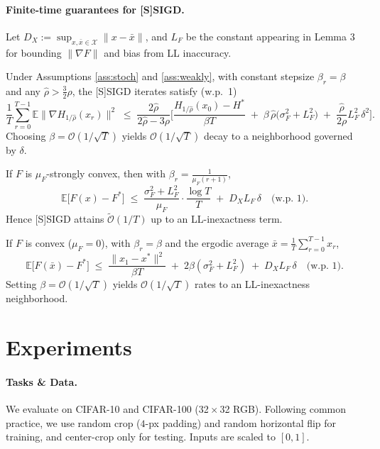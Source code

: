 \paragraph{Finite-time guarantees for [S]SIGD.}
Let $D_X:=\sup_{x,\bar x\in \mathcal{X}}\|x-\bar x\|$, and $L_F$ be the constant appearing in Lemma 3 for bounding $\|\nabla F\|$ and bias from LL inaccuracy.

\begin{theorem}
Under Assumptions \ref{ass:stoch} and \ref{ass:weakly}, with constant stepsize $\beta_r=\beta$ and any $\hat\rho> \tfrac{3}{2}\rho$, the [S]SIGD iterates satisfy (w.p.~1)
\[
\frac{1}{T}\sum_{r=0}^{T-1}\mathbb{E}\big\|\nabla H_{1/\hat\rho}(x_r)\big\|^2
\;\le\;
\frac{2\hat\rho}{2\hat\rho-3\rho}\Bigg[
\frac{H_{1/\hat\rho}(x_0)-H^*}{\beta T}
\;+\;\beta\,\hat\rho\big(\sigma_F^2+L_F^2\big)
\;+\;\frac{\hat\rho}{2\rho}L_F^2\,\delta^2
\Bigg].
\]
Choosing $\beta=\mathcal{O}(1/\sqrt{T})$ yields $\mathcal{O}(1/\sqrt{T})$ decay to a neighborhood governed by $\delta$.
\end{theorem}

\begin{theorem}
If $F$ is $\mu_F$-strongly convex, then with $\beta_r=\frac{1}{\mu_F(r+1)}$,
\[
\mathbb{E}\big[F(x)-F^*\big]
\;\le\;
\frac{\sigma_F^2+L_F^2}{\mu_F}\cdot \frac{\log T}{T}
\;+\; D_X L_F\,\delta
\quad\text{(w.p.~1)}.
\]
Hence [S]SIGD attains $\tilde{\mathcal{O}}(1/T)$ up to an LL-inexactness term.
\end{theorem}

\begin{theorem}
If $F$ is convex ($\mu_F=0$), with $\beta_r=\beta$ and the ergodic average $\bar x=\frac{1}{T}\sum_{r=0}^{T-1}x_r$,
\[
\mathbb{E}\big[F(\bar x)-F^*\big]
\;\le\;
\frac{\|x_1-x^*\|^2}{\beta T}
\;+\;2\beta(\sigma_F^2+L_F^2)
\;+\; D_X L_F\,\delta
\quad\text{(w.p.~1)}.
\]
Setting $\beta=\mathcal{O}(1/\sqrt{T})$ yields $\mathcal{O}(1/\sqrt{T})$ rates to an LL-inexactness neighborhood.
\end{theorem}
\section{Experiments}

\paragraph{Tasks \& Data.}
We evaluate on CIFAR-10 and CIFAR-100 (32\,$\times$\,32 RGB). Following common practice, we use random crop ($4$-px padding) and random horizontal flip for training, and center-crop only for testing. Inputs are scaled to $[0,1]$.

